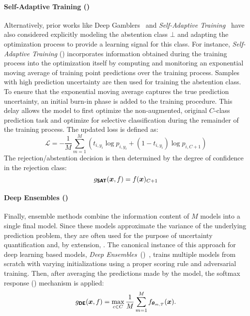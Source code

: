  \paragraph{Self-Adaptive Training (\sat)}
 Alternatively, prior works like Deep Gamblers~\citep{liu2019deep} and \emph{Self-Adaptive Training}~\citep{huang2020self} have also considered explicitly modeling the abstention class $\bot$ and adapting the optimization process to provide a learning signal for this class. For instance, \emph{Self-Adaptive Training} (\sat) incorporates information obtained during the training process into the optimization itself by computing and monitoring an exponential moving average of training point predictions over the training process. Samples with high prediction uncertainty are then used for training the abstention class. To ensure that the exponential moving average captures the true prediction uncertainty, an initial burn-in phase is added to the training procedure. This delay allows the model to first optimize the non-augmented, \ie original $C$-class prediction task and optimize for selective classification during the remainder of the training process. The updated loss is defined as:
 \begin{equation}
 	\mathcal{L} = -\frac{1}{M}\sum_{m=1}^{M} \left ( t_{i,y_i}\log p_{i,y_i} + (1-t_{i,y_i})\log p_{i,C+1} \right )
 \end{equation}
The rejection/abstention decision is then determined by the degree of confidence in the rejection class:
\begin{equation}
	g_{\textbf{\sffamily SAT}}(\bm{x}, f) = f(\bm{x})_{C+1}
\end{equation}

 \paragraph{Deep Ensembles (\de)}
 Finally, ensemble methods combine the information content of $M$ models into a single final model. Since these models approximate the variance of the underlying prediction problem, they are often used for the purpose of uncertainty quantification and, by extension, \selp. The canonical instance of this approach for deep learning based models, \emph{Deep Ensembles}~(\de)~\citep{lakshminarayanan2017simple}, trains multiple models from scratch with varying initializations using a proper scoring rule and adversarial training. Then, after averaging the predictions made by the model, the softmax response (\sr) mechanism is applied:
 \begin{equation}
 	g_{\textbf{\sffamily DE}}(\bm{x}, f) = \max_{c \in C} \frac{1}{M} \sum_{m=1}^{M} f_{\bm{\theta}_{m,T}}(\bm{x}).
 \end{equation}
 
